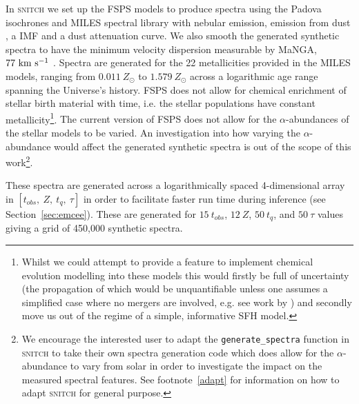 \documentclass[useAMS,usenatbib]{mn2e}
\def\referee		{\color{refer}}
\begin{document}



In \textsc{snitch} we set up the FSPS models to produce spectra using the Padova isochrones \citep{girardi02} and MILES spectral library \citep{vazdekis16} with nebular emission, emission from dust \cite{draineli07}, a \cite{chabrier03} IMF and a \cite{calzetti00} dust attenuation curve. We also smooth the generated synthetic spectra to have the minimum velocity dispersion measurable by MaNGA, $77~\rm{km}~{s}^{-1}$ \citep{bundy15}. Spectra are generated for the 22 metallicities provided in the MILES models, ranging from $0.011~Z_{\odot}$ to $1.579~Z_{\odot}$ across a logarithmic age range spanning the Universe's history. FSPS does not allow for chemical enrichment of stellar birth material with time, i.e. the stellar populations have constant metallicity\footnote{Whilst we could attempt to provide a feature to implement chemical evolution modelling into these models this would firstly be full of uncertainty (the propagation of which would be unquantifiable {\referee unless one assumes a simplified case where no mergers are involved, e.g. see work by \citealt{kirby13, chill18}}) and secondly move us out of the regime of a simple, informative SFH model.}. {\referee The current version of FSPS does not allow for the $\alpha$-abundances of the stellar models to be varied. An investigation into how varying the $\alpha$-abundance would affect the generated synthetic spectra is out of the scope of this work}\footnote{{\referee We encourage the interested user to adapt the \texttt{generate\_spectra} function in \textsc{snitch} to take their own spectra generation code which does allow for the $\alpha$-abundance to vary from solar in order to investigate the impact on the measured spectral features. See footnote~\ref{adapt} for information on how to adapt \textsc{snitch} for general purpose.}}.

These spectra are generated across a logarithmically spaced 4-dimensional array in $[t_{obs},~Z,~t_q,~\tau]$ in order to facilitate faster run time during inference (see Section~\ref{sec:emcee}). These are generated for $15~t_{obs}$, $12~Z$, $50~t_q$, and $50~\tau$ values giving a grid of 450,000 synthetic spectra.
\end{document}
